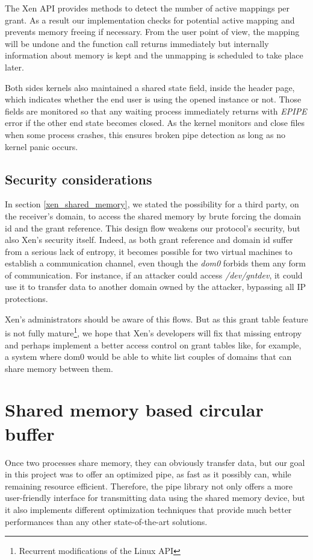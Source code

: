 \documentclass[journal]{IEEEtran}
\begin{document}
The Xen API provides methods to detect the number of active mappings per grant. As a result our implementation checks for potential active mapping and prevents memory freeing if necessary. From the user point of view, the mapping will be undone and the function call returns immediately but internally information about memory is kept and the unmapping is scheduled to take place later.

Both sides kernels also maintained a shared state field, inside the header page, which indicates whether the end user is using the opened instance or not. Those fields are monitored so that any waiting process immediately returns with \emph{EPIPE} error if the other end state becomes closed. As the kernel monitors and close files when some process crashes, this ensures broken pipe detection as long as no kernel panic occurs.

\subsection{Security considerations}

In section \ref{xen_shared_memory}, we stated the possibility for a third party, on the receiver's domain, to access the shared memory by brute forcing the domain id and the grant reference. This design flow weakens our protocol's security, but also Xen's security itself. Indeed, as both grant reference and domain id suffer from a serious lack of entropy, it becomes possible for two virtual machines to establish a communication channel, even though the \emph{dom0} forbids them any form of communication. For instance, if an attacker could access \emph{/dev/gntdev}, it could use it to transfer data to another domain owned by the attacker, bypassing all IP protections. 

Xen's administrators should be aware of this flows. But as this grant table feature is not fully mature\footnote{Recurrent modifications of the Linux API}, we hope that Xen's developers will fix that missing entropy and perhaps implement a better access control on grant tables like, for example, a system where dom0 would be able to white list couples of domains that can share memory between them.

\section{Shared memory based circular buffer}

Once two processes share memory, they can obviously transfer data, but our goal in this project was to offer an optimized pipe, as fast as it possibly can, while remaining resource efficient. Therefore, the pipe library not only offers a more user-friendly interface for transmitting data using the shared memory device, but it also implements different optimization techniques that provide much better performances than any other state-of-the-art solutions. 
\end{document}
